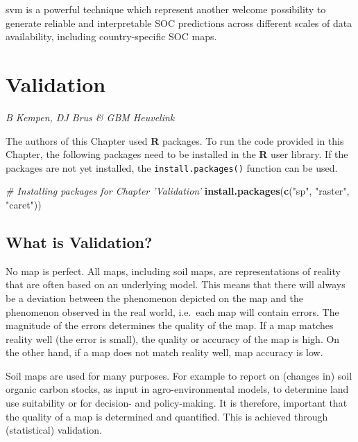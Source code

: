 \documentclass[10pt,b5paper,]{book}
\newenvironment{Shaded}{\begin{snugshade}}{\end{snugshade}}
\newcommand{\CommentTok}[1]{\textcolor[rgb]{0.56,0.35,0.01}{\textit{#1}}}
\newcommand{\KeywordTok}[1]{\textcolor[rgb]{0.13,0.29,0.53}{\textbf{#1}}}
\newcommand{\NormalTok}[1]{#1}
\newcommand{\StringTok}[1]{\textcolor[rgb]{0.31,0.60,0.02}{#1}}
\theoremstyle{definition}
\theoremstyle{definition}
\theoremstyle{definition}
\theoremstyle{remark}
\begin{document}
svm is a powerful technique which represent another welcome possibility
to generate reliable and interpretable SOC predictions across different
scales of data availability, including country-specific SOC maps.

\hypertarget{chvalidation}{%
\chapter{Validation}\label{chvalidation}}

\emph{B Kempen, DJ Brus \& GBM Heuvelink}

The authors of this Chapter used \textbf{R} packages. To run the code
provided in this Chapter, the following packages need to be installed in
the \textbf{R} user library. If the packages are not yet installed, the
\texttt{install.packages()} function can be used.

\begin{Shaded}
\begin{Highlighting}[]
\CommentTok{# Installing packages for Chapter 'Validation'}
\KeywordTok{install.packages}\NormalTok{(}\KeywordTok{c}\NormalTok{(}\StringTok{"sp"}\NormalTok{, }\StringTok{"raster"}\NormalTok{, }\StringTok{"caret"}\NormalTok{))}
\end{Highlighting}
\end{Shaded}

\hypertarget{what-is-validation}{%
\section{What is Validation?}\label{what-is-validation}}

No map is perfect. All maps, including soil maps, are representations of
reality that are often based on an underlying model. This means that
there will always be a deviation between the phenomenon depicted on the
map and the phenomenon observed in the real world, i.e.~each map will
contain errors. The magnitude of the errors determines the quality of
the map. If a map matches reality well (the error is small), the quality
or accuracy of the map is high. On the other hand, if a map does not
match reality well, map accuracy is low.

Soil maps are used for many purposes. For example to report on (changes
in) soil organic carbon stocks, as input in agro-environmental models,
to determine land use suitability or for decision- and policy-making. It
is therefore, important that the quality of a map is determined and
quantified. This is achieved through (statistical) validation.
\end{document}
